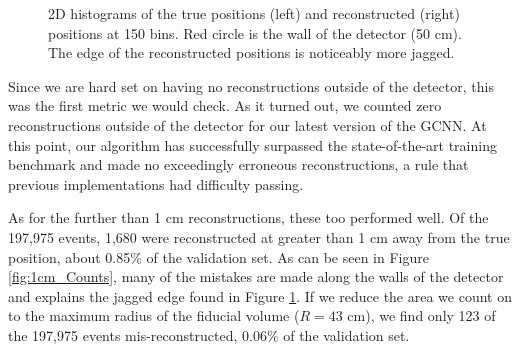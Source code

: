 \documentclass[thesis.tex]{subfiles}
\begin{document}
\begin{figure}[t]
\begin{subfigure}[b]{0.45\textwidth}
	\end{subfigure}
	\caption{
	2D histograms of the true positions (left) and reconstructed (right) positions at 150 bins.
	Red circle is the wall of the detector (50 cm).
	The edge of the reconstructed positions is noticeably more jagged.
	}
	\label{fig:2D_Hists}
\end{figure}

\par Since we are hard set on having no reconstructions outside of the detector, this was the first metric we would check.
As it turned out, we counted zero reconstructions outside of the detector for our latest version of the GCNN.
At this point, our algorithm has successfully surpassed the state-of-the-art training benchmark and made no exceedingly erroneous reconstructions, a rule that previous implementations had difficulty passing.

\par As for the further than 1 cm reconstructions, these too performed well.
Of the 197,975 events, 1,680 were reconstructed at greater than 1 cm away from the true position, about 0.85\% of the validation set.
As can be seen in Figure \ref{fig:1cm_Counts}, many of the mistakes are made along the walls of the detector and explains the jagged edge found in Figure \ref{fig:2D_Hists}.
If we reduce the area we count on to the maximum radius of the fiducial volume ($R=43$ cm), we find only 123 of the 197,975 events mis-reconstructed, 0.06\% of the validation set.
\end{document}
